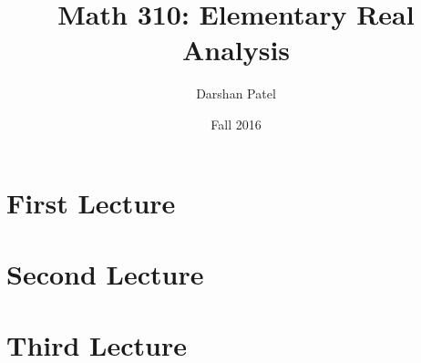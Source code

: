 \documentclass[12pt]{article}
\begin{document}
\title{Math 310: Elementary Real Analysis}
\author{Darshan Patel}
\date{Fall 2016}
\maketitle

\tableofcontents

\newpage
\section{First Lecture}

\newpage
\section{Second Lecture}

\newpage
\section{Third Lecture}
\end{document}
